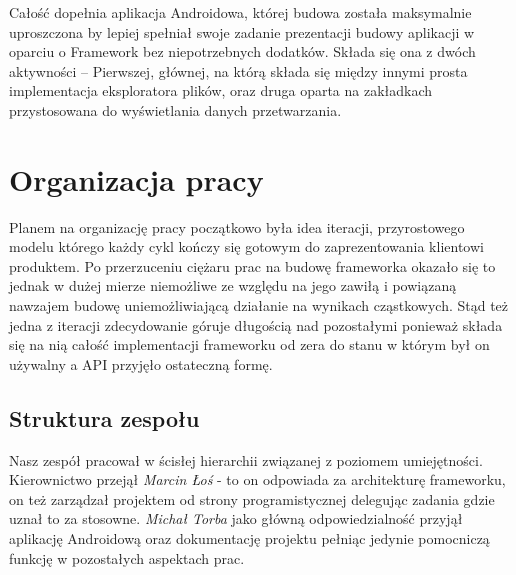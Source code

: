 Całość dopełnia aplikacja Androidowa, której budowa została maksymalnie uproszczona by lepiej spełniał swoje zadanie prezentacji budowy aplikacji w oparciu o Framework bez niepotrzebnych dodatków. Składa się ona z dwóch aktywności -- Pierwszej, głównej, na którą składa się między innymi prosta implementacja eksploratora plików, oraz druga oparta na zakładkach przystosowana do wyświetlania danych przetwarzania.

\chapter{Organizacja pracy}
Planem na organizację pracy początkowo była idea iteracji, przyrostowego modelu którego każdy cykl kończy się gotowym do zaprezentowania klientowi produktem. Po przerzuceniu ciężaru prac na budowę frameworka okazało się to jednak w dużej mierze niemożliwe ze względu na jego zawiłą i powiązaną nawzajem budowę uniemożliwiającą działanie na wynikach cząstkowych. Stąd też jedna z iteracji zdecydowanie góruje długością nad pozostałymi ponieważ składa się na nią całość implementacji frameworku od zera do stanu w którym był on używalny a API przyjęło ostateczną formę.

\section{Struktura zespołu}
Nasz zespół pracował w ścisłej hierarchii związanej z poziomem umiejętności. Kierownictwo przejął \emph{Marcin Łoś} - to on odpowiada za architekturę frameworku, on też zarządzał projektem od strony programistycznej delegując zadania gdzie uznał to za stosowne. \emph{Michał Torba} jako główną odpowiedzialność przyjął aplikację Androidową oraz dokumentację projektu pełniąc jedynie pomocniczą funkcję w pozostałych aspektach prac.
